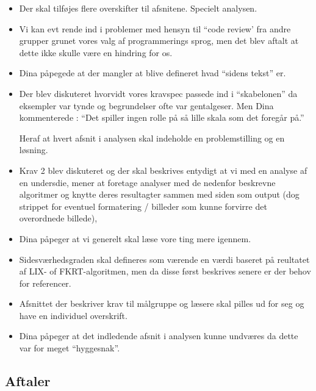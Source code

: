 \documentclass[a4paper,10pt,draft]{article}
\begin{document}
\begin{itemize}

    \item Der skal tilføjes flere overskifter til afsnitene. Specielt analysen.

	\item Vi kan evt rende ind i problemer med hensyn til ``code review' fra andre grupper grunet vores valg af programmerings sprog, men det blev aftalt at dette ikke skulle være en hindring for os.

	\item Dina påpegede at der mangler at blive defineret hvad ``sidens tekst'' er.

	\item Der blev diskuteret hvorvidt vores kravspec passede ind i ``skabelonen'' da eksempler var tynde og begrundelser ofte var gentalgeser. Men Dina kommenterede : ``Det spiller ingen rolle på så lille skala som det foregår på.''

	Heraf at hvert afsnit i analysen skal indeholde en problemstilling og en løsning.

	\item Krav 2 blev diskuteret og der skal beskrives entydigt at vi med en analyse af en undersdie, mener at foretage analyser med de nedenfor beskrevne algoritmer og knytte deres resultagter sammen med siden som output (dog strippet for eventuel formatering / billeder som kunne forvirre det overordnede billede),

	\item Dina påpeger at vi generelt skal læse vore ting mere igennem.

	\item Sidesværhedsgraden skal defineres som værende en værdi baseret på reultatet af LIX- of FKRT-algoritmen, men da disse først beskrives senere er der behov for referencer.

	\item  Afsnittet der beskriver krav til målgruppe og læsere skal pilles ud for seg og have en individuel overskrift.

	\item Dina påpeger at det indledende afsnit i analysen kunne undværes da dette var for meget ``hyggesnak''.

\end{itemize}

\subsection{Aftaler}
\end{document}
